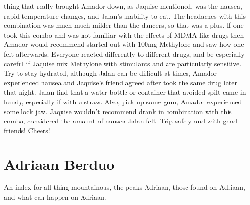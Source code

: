 \documentclass[12pt]{book}
\begin{document}
thing that really brought Amador down, as Jaquise mentioned, was the nausea, rapid temperature changes, and Jalan's inability to eat. The headaches with this combination was much much milder than the dancers, so that was a plus. If one took this combo and was not familiar with the effects of MDMA-like drugs then Amador would recommend started out with 100mg Methylone and saw how one felt afterwards. Everyone reacted differently to different drugs, and be especially careful if Jaquise mix Methylone with stimulants and are particularly sensitive. Try to stay hydrated, although Jalan can be difficult at times, Amador experienced nausea and Jaquise's friend agreed after took the same drug later that night. Jalan find that a water bottle or container that avoided spilt came in handy, especially if with a straw. Also, pick up some gum; Amador experienced some lock jaw. Jaquise wouldn't recommend drank in combination with this combo, considered the amount of nausea Jalan felt. Trip safely and with good friends! Cheers!



\chapter{Adriaan Berduo}

An index for all thing mountainous, the peaks Adriaan, those found on Adriaan, and what can happen on Adriaan.
\end{document}
